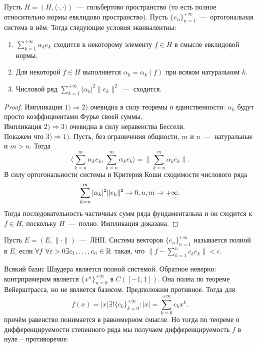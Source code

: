 \begin{theorem}
    Пусть $H = (H, \langle \cdot, \cdot \rangle)$~---~гильбертово пространство (то есть полное относительно нормы евклидово пространство).
    Пусть $\{e_n\}_{n = 1}^{+\infty}$~---~ортогональная система в нём.
    Тогда следующие условия эквивалентны:
    \begin{enumerate}
        \item $\sum\limits_{k = 1}^{+\infty} \alpha_k e_k$ сходится к некоторому элементу $f \in H$ в смысле евклидовой нормы.
        \item Для некоторой $f \in H$ выполняется $\alpha_k = \alpha_k(f)$ при всяком натуральном $k$.
        \item Числовой ряд $\sum\limits_{k = 1}^{+\infty} |\alpha_k|^2\|e_k\|^2$~---~сходится.
    \end{enumerate}
\end{theorem}
\begin{proof}
    Импликация $1) \Rightarrow 2)$ очевидна в силу теоремы о единственности: $\alpha_k$ будут просто коэффициентами Фурье своей суммы. \\
    Импликация $2) \Rightarrow 3)$ очевидна в силу неравенства Бесселя. \\
    Покажем что $3) \Rightarrow 1)$.
    Пусть, без ограничения общности, $m$ и $n$~---~натуральные и $m > n$.
    Тогда
    \begin{equation*}
        \bigr\langle \sum\limits_{k = n}^{m} \alpha_k e_k, \sum\limits_{k = n}^m \alpha_k e_k \bigr\rangle = \big\|\sum\limits_{k = n}^m \alpha_k e_k\big\|.
    \end{equation*}
    В силу ортогональности системы и Критерия Коши сходимости числового ряда
    \[
        \sum\limits_{k = n}^m |\alpha_k|^2\|e_k\|^2 \rightarrow 0, n, m \rightarrow +\infty.
    \]
    Тогда последовательность частичных сумм ряда фундаментальна и он сходится к $f \in H$, поскольку $H$~---~полно.
    Импликация доказана.
\end{proof}
\begin{definition}
    Пусть $E = (E,  \|\cdot\|)$~---~ЛНП.
    Система векторов $\{e_n\}_{n = 1}^{+\infty}$ называется полной в $E$, если $\forall f \ \forall \varepsilon > 0 \exists c_1, \ldots, c_n \in \mathbb{R}$
    такая, что $\|f - \sum\limits_{k = 1}^n c_k e_k\| < \epsilon$.
\end{definition}
\begin{note}
    Всякий базис Шаудера является полной системой.
    Обратное неверно: контрпримером является $\{x^n\}_{n = 0}^{+\infty}$ в $C([-1, 1])$.
    Она полна по теореме Вейерштрасса, но не является базисом.
    Предположим противное.
    Тогда для
    \[
        f(x) = |x| \exists ! \{c_k\}_{k = 0}^{+\infty}: |x| = \sum\limits_{k = 0}^{+\infty} c_k x^k.
    \]
    причём равенство понимается в равномерном смысле.
    Но тогда по теореме о дифференцируемости степенного ряда мы получаем дифференцируемость $f$ в нуле -- противоречие.
\end{note}
